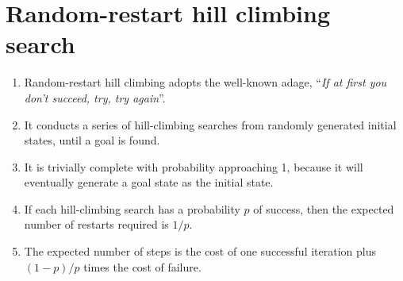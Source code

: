 \section{Random-restart hill climbing search \cite{ai/book/Artificial-Intelligence-A-Modern-Approach/Russell-Norvig}}
\label{AI: Algorithms/Random-restart hill climbing search}


\begin{enumerate}
    \item Random-restart hill climbing adopts the well-known adage, “\textit{If at first you don’t succeed, try, try again}”.
    \hfill \cite{ai/book/Artificial-Intelligence-A-Modern-Approach/Russell-Norvig}

    \item It conducts a series of hill-climbing searches from randomly generated initial states, until a goal is found. 
    \hfill \cite{ai/book/Artificial-Intelligence-A-Modern-Approach/Russell-Norvig}
    
    \item It is trivially complete with probability approaching 1, because it will eventually generate a goal state as the initial state. 
    \hfill \cite{ai/book/Artificial-Intelligence-A-Modern-Approach/Russell-Norvig}

    \item If each hill-climbing search has a probability $p$ of success, then the expected number of restarts required is $1/p$.
    \hfill \cite{ai/book/Artificial-Intelligence-A-Modern-Approach/Russell-Norvig}

    \item The expected number of steps is the cost of one successful iteration plus $(1-p)/p$ times the cost of failure.
    \hfill \cite{ai/book/Artificial-Intelligence-A-Modern-Approach/Russell-Norvig}
\end{enumerate}







